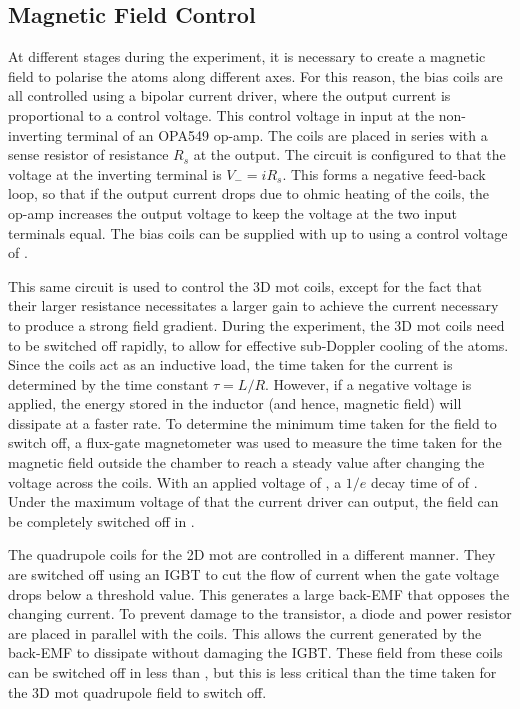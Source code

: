 \subsection{Magnetic Field Control}
At different stages during the experiment, it is necessary to create a magnetic
field to polarise the atoms along different axes. For this reason, the bias
coils are all controlled using a bipolar current driver, where the output
current is proportional to a control voltage. This control voltage in input at
the non-inverting terminal of an OPA549 op-amp. The coils are placed in series
with a sense resistor of resistance \(R_s\) at the output. The circuit is
configured to that the voltage at the inverting terminal is \(V_- = i R_s\).
This forms a negative feed-back loop, so that if the output current drops due to
ohmic heating of the coils, the op-amp increases the output voltage to keep the
voltage at the two input terminals equal. The bias coils can be supplied with up
to  using a control voltage of .
\par\noindent This same circuit is used to control the 3D \ac{mot} coils, except
for the fact that their larger resistance necessitates a larger gain to achieve
the current necessary to produce a strong field gradient. During the experiment,
the 3D \ac{mot} coils need to be switched off rapidly, to allow for effective
sub-Doppler cooling of the atoms. Since the coils act as an inductive load, the
time taken for the current is determined by the time constant \(\tau = L/R\).
However, if a negative voltage is applied, the energy stored in the inductor
(and hence, magnetic field) will dissipate at a faster rate. To determine the
minimum time taken for the field to switch off, a flux-gate magnetometer was
used to measure the time taken for the magnetic field outside the chamber to
reach a steady value after changing the voltage across the coils. With an
applied voltage of , a \(1/e\) decay time of of
. Under the maximum voltage  of 
that the current driver can output, the field can be completely switched off in
. \par\noindent The quadrupole coils for the 2D
\ac{mot} are controlled in a different manner. They are switched off using an
IGBT to cut the flow of current when the gate voltage drops below a threshold
value. This generates a large back-EMF that opposes the changing current. To
prevent damage to the transistor, a diode and  power resistor
are placed in parallel with the coils. This allows the current generated by the
back-EMF to dissipate without damaging the IGBT. These field from these coils
can be switched off in less than , but this is less
critical than the time taken for the 3D \ac{mot} quadrupole field to switch off.

